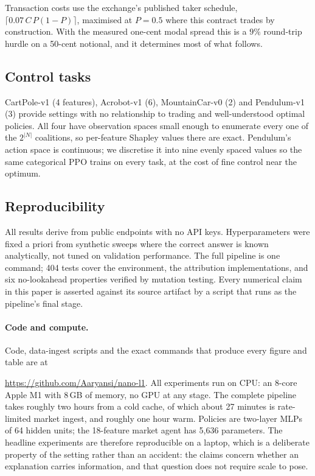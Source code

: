 \documentclass[10pt,twocolumn]{article}
\newif\ifanon
\begin{document}
Transaction costs use the exchange's published taker schedule,
$\lceil 0.07\,C\,P(1-P)\rceil$, maximised at $P=0.5$ where this contract trades by
construction. With the measured one-cent modal spread this is a $9\%$ round-trip
hurdle on a 50-cent notional, and it determines most of what follows.

\subsection{Control tasks}

CartPole-v1 (4 features), Acrobot-v1 (6), MountainCar-v0 (2) and Pendulum-v1
(3) provide settings with no relationship to trading and well-understood optimal
policies. All four have observation spaces small enough to enumerate every one
of the $2^{|N|}$ coalitions, so per-feature Shapley values there are exact.
Pendulum's action space is continuous; we discretise it into nine evenly spaced
values so the same categorical PPO trains on every task, at the cost of fine
control near the optimum.

\subsection{Reproducibility}

All results derive from public endpoints with no API keys. Hyperparameters were
fixed a priori from synthetic sweeps where the correct answer is known
analytically, not tuned on validation performance. The full pipeline is one
command; 404 tests cover the environment, the attribution implementations, and
six no-lookahead properties verified by mutation testing. Every numerical claim
in this paper is asserted against its source artifact by a script that runs as
the pipeline's final stage.

\paragraph{Code and compute.} Code, data-ingest scripts and the exact commands
that produce every figure and table are at
\ifanon\emph{[repository URL withheld for anonymous review]}\else
\url{https://github.com/Aaryansi/nano-l1}\fi. All experiments run on CPU: an
8-core Apple M1 with 8\,GB of memory, no GPU at any stage. The complete pipeline
takes roughly two hours from a cold cache, of which about 27 minutes is
rate-limited market ingest, and roughly one hour warm. Policies are two-layer
MLPs of 64 hidden units; the 18-feature market agent has 5{,}636 parameters. The
headline experiments are therefore reproducible on a laptop, which is a
deliberate property of the setting rather than an accident: the claims concern
whether an explanation carries information, and that question does not require
scale to pose.
\end{document}
